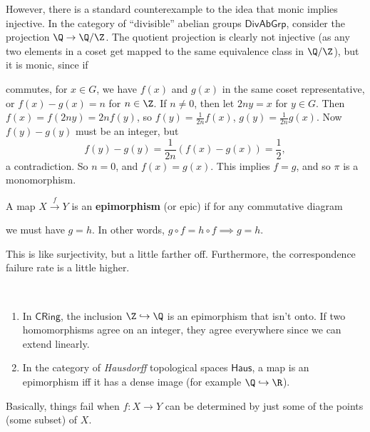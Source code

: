 \begin{example}
However, there is a standard counterexample to the idea that monic implies injective. In the category of ``divisible'' abelian groups $\mathsf{DivAbGrp} $, consider the projection $\Q\to \Q /\Z$. The quotient projection is clearly not injective (as any two elements in a coset get mapped to the same equivalence class in $\Q /\Z$), but it is monic, since if 

\begin{figure}[H]
\centering
{}
\end{figure}commutes, for $x \in G$, we have $f(x)$ and $g(x)$ in the same coset representative, or $f(x)-g(x)=n$ for $n \in \Z$. If $n \neq 0$, then let  $2ny =x$ for $y \in G$. Then $f(x)=f(2ny)=2n f(y)$, so $f(y)=\frac{1}{2n}f(x)$, $g(y)=\frac{1}{2n}g(x)$. Now $f(y)-g(y)$ must be an integer, but \[
f(y)-g(y)=\frac{1}{2n}(f(x)-g(x))=\frac{1}{2},
\] a contradiction. So $n=0$, and $f(x)=g(x)$. This implies $f=g$, and so $\pi$ is a monomorphism.
\end{example}

\begin{definition}[Epimorphisms]
    A map $X \overset{f}{\to } Y$ is an \textbf{epimorphism} (or epic) if for any commutative diagram 
    \begin{figure}[H]
    \centering
    \end{figure}
    we must have $g=h$. In other words, $g\circ f=h\circ f\implies g=h$. \end{definition}
This is like surjectivity, but a little farther off. Furthermore, the correspondence failure rate is a little higher.
\begin{example}
    \,
    \begin{enumerate}[label=(\alph*)]
        \item In $\mathsf{CRing} $, the inclusion $\Z\hookrightarrow \Q$ is an epimorphism that isn't onto. If two homomorphisms agree on an integer, they agree everywhere since we can extend linearly.
        \item In the category of \emph{Hausdorff} topological spaces $\mathsf{Haus} $, a map is an epimorphism iff it has a dense image (for example $\Q\hookrightarrow \R$). 
    \end{enumerate}
    Basically, things fail when $f \colon X \to Y$ can be determined by just some of the points (some subset) of $X$.
\end{example}


